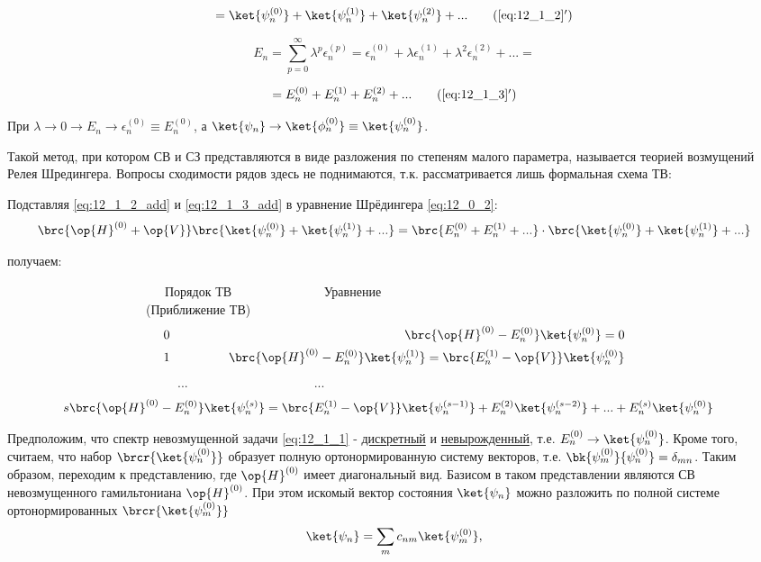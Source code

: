 \begin{equation}
\label{eq:12_1_2_add}
= \ket{\psi_n^{(0)}} + \ket{\psi_n^{(1)}} + \ket{\psi_n^{(2)}} + ...
\tag{\ref{eq:12_1_2}$'$}
\end{equation}

\begin{equation}
\label{eq:12_1_3}
E_n = \sum_{p=0}^{\infty} \lambda^p \epsilon_n^{(p)} = \epsilon_n^{(0)} + \lambda \epsilon_n^{(1)} + \lambda^2 \epsilon_n^{(2)} + ... = 
\end{equation}

\begin{equation}
\label{eq:12_1_3_add}
= E_n^{(0)} + E_n^{(1)} + E_n^{(2)} + ...
\tag{\ref{eq:12_1_3}$'$}
\end{equation}

При $\lambda \to 0 \rightarrow E_n \to \epsilon_n^{(0)} \equiv E_n^{(0)}$, а $\ket{\psi_n} \to \ket{\phi_n^{(0)}} \equiv \ket{\psi_n^{(0)}}$.

Такой метод, при котором СВ и СЗ представляются в виде разложения по степеням малого параметра, называется теорией возмущений Релея Шредингера. Вопросы сходимости рядов здесь не поднимаются, т.к. рассматривается лишь формальная схема ТВ:

Подставляя \eqref{eq:12_1_2_add} и \eqref{eq:12_1_3_add} в уравнение Шрёдингера \eqref{eq:12_0_2}:
$$
\brc{\op{H}^{(0)} + \op{V}} \brc{\ket{\psi_n^{(0)}} + \ket{\psi_n^{(1)}} + ...} = \brc{E_n^{(0)} + E_n^{(1)} + ...} \cdot \brc{\ket{\psi_n^{(0)}} + \ket{\psi_n^{(1)}} + ...}
$$

получаем:

~~~~~~~~~~~~~~~~~~~~~~~~~Порядок ТВ ~~~~~~~~~~~~~~Уравнение\\
~~~~~~~~~~~~~~~~~~~~~~(Приближение ТВ) ~~~~~~~~~~~~~~
\begin{eqnarray}
\label{eq:12_1_4} 0 &~~~~~~~~~~~& \brc{\op{H}^{(0)} - E_n^{(0)}} \ket{\psi_n^{(0)}} = 0\\
\label{eq:12_1_5} 1 &~~~~~~~~~~~& \brc{\op{H}^{(0)} - E_n^{(0)}} \ket{\psi_n^{(1)}} = \brc{E_n^{(1)} - \op{V}} \ket{\psi_n^{(0)}} 
\end{eqnarray}
~~~~~~~~~~~~~~~~~~~~~~~~~~~...~~~~~~~~~~~~~~~~~~~~...
\begin{eqnarray}
 \label{eq:12_1_6} s & \brc{\op{H}^{(0)} - E_n^{(0)}} \ket{\psi_n^{(s)}} = \brc{E_n^{(1)} - \op{V}} \ket{\psi_n^{(s-1)}}  + E_n^{(2)}\ket{\psi_n^{(s-2)}}+...+ E_n^{(s)}\ket{\psi_n^{(0)}}
\end{eqnarray}

Предположим, что спектр невозмущенной задачи \eqref{eq:12_1_1} - \underline{дискретный} и \underline{невырожденный}, т.е. $E_n^{(0)} \to \ket{\psi_n^{(0)}}$. Кроме того, считаем, что набор $\brcr{\ket{\psi_n^{(0)}}}$ образует полную ортонормированную систему векторов, т.е. $\bk{\psi_m^{(0)}}{\psi_n^{(0)}} = \delta_{mn}$. Таким образом, переходим к представлению, где $\op{H}^{(0)}$ имеет диагональный вид. Базисом в таком представлении являются СВ невозмущенного гамильтониана $\op{H}^{(0)}$. При этом искомый вектор состояния $\ket{\psi_n}$ можно разложить по полной системе ортонормированных $\brcr{\ket{\psi_m^{(0)}}}$
$$
\ket{\psi_n}= \sum_m c_{nm} \ket{\psi_m^{(0)}}, 
$$

